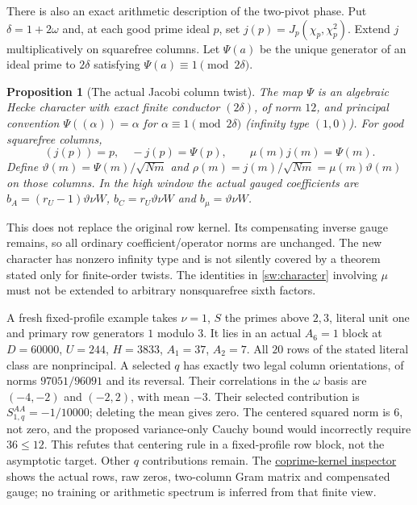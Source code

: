 \documentclass[11pt]{article}
\newtheorem{proposition}[theorem]{Proposition}
\theoremstyle{definition}\newtheorem{definition}[theorem]{Definition}
\theoremstyle{remark}\newtheorem{remark}[theorem]{Remark}
\begin{document}
There is also an exact arithmetic description of the two-pivot phase.
Put $\delta=1+2\omega$ and, at each good prime ideal $p$, set
$j(p)=J_p(\chi_p,\chi_p^2)$. Extend $j$ multiplicatively on squarefree
columns. Let $\Psi(a)$ be the unique generator of an ideal prime to
$2\delta$ satisfying $\Psi(a)\equiv1\pmod{2\delta}$.
\begin{proposition}[The actual Jacobi column twist]\label{sw:twist}
The map $\Psi$ is an algebraic Hecke character with exact finite conductor
$(2\delta)$, of norm $12$, and principal convention
$\Psi((\alpha))=\alpha$ for $\alpha\equiv1\pmod{2\delta}$
(infinity type $(1,0)$). For good squarefree columns,
\begin{equation}\label{sw:character}
 (j(p))=p,\quad -j(p)=\Psi(p),\qquad
 \mu(m)j(m)=\Psi(m).
\end{equation}
Define $\vartheta(m)=\Psi(m)/\sqrt{Nm}$ and
$\rho(m)=j(m)/\sqrt{Nm}=\mu(m)\vartheta(m)$ on those columns.
In the high window the actual gauged coefficients are
$b_A=(r_U-1)\vartheta\nu W$, $b_C=r_U\vartheta\nu W$ and
$b_\mu=\vartheta\nu W$.
\end{proposition}
This does not replace the original row kernel. Its compensating inverse
gauge remains, so all ordinary coefficient/operator norms are unchanged.
The new character has nonzero infinity type and is not silently covered
by a theorem stated only for finite-order twists. The identities in
\eqref{sw:character} involving $\mu$ must not be extended to arbitrary
nonsquarefree sixth factors.

A fresh fixed-profile example takes $\nu=1$, $S$ the primes above $2,3$,
literal unit one and primary row generators $1$ modulo $3$. It lies in an
actual $A_6=1$ block at $D=60000$, $U=244$, $H=3833$, $A_1=37$, $A_2=7$.
All $20$ rows of the stated literal class are nonprincipal. A selected
$q$ has exactly two legal column orientations, of norms $97051/96091$
and its reversal. Their correlations in the $\omega$ basis are
$(-4,-2)$ and $(-2,2)$, with mean $-3$. Their selected contribution is
$S_{1,q}^{AA}=-1/10000$; deleting the mean gives zero.
The centered squared norm is $6$, not zero, and the proposed
variance-only Cauchy bound would incorrectly require $36\le12$.
This refutes that centering rule in a fixed-profile row block, not the
asymptotic target. Other $q$ contributions remain.
The \href{../profile-uniformity.html#fixed-h1}{coprime-kernel inspector}
shows the actual rows, raw zeros, two-column Gram matrix and compensated
gauge; no training or arithmetic spectrum is inferred from that finite view.
\end{document}
